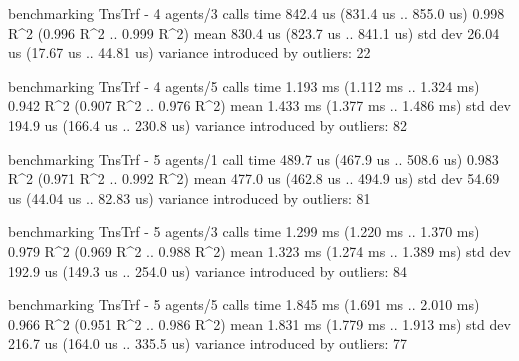 \begin{showCode}
benchmarking TnsTrf - 4 agents/3 calls
time                 842.4 us   (831.4 us .. 855.0 us)
                     0.998 R^2   (0.996 R^2 .. 0.999 R^2)
mean                 830.4 us   (823.7 us .. 841.1 us)
std dev              26.04 us   (17.67 us .. 44.81 us)
variance introduced by outliers: 22%

benchmarking TnsTrf - 4 agents/5 calls
time                 1.193 ms   (1.112 ms .. 1.324 ms)
                     0.942 R^2   (0.907 R^2 .. 0.976 R^2)
mean                 1.433 ms   (1.377 ms .. 1.486 ms)
std dev              194.9 us   (166.4 us .. 230.8 us)
variance introduced by outliers: 82%

benchmarking TnsTrf - 5 agents/1 call
time                 489.7 us   (467.9 us .. 508.6 us)
                     0.983 R^2   (0.971 R^2 .. 0.992 R^2)
mean                 477.0 us   (462.8 us .. 494.9 us)
std dev              54.69 us   (44.04 us .. 82.83 us)
variance introduced by outliers: 81%

benchmarking TnsTrf - 5 agents/3 calls
time                 1.299 ms   (1.220 ms .. 1.370 ms)
                     0.979 R^2   (0.969 R^2 .. 0.988 R^2)
mean                 1.323 ms   (1.274 ms .. 1.389 ms)
std dev              192.9 us   (149.3 us .. 254.0 us)
variance introduced by outliers: 84%

benchmarking TnsTrf - 5 agents/5 calls
time                 1.845 ms   (1.691 ms .. 2.010 ms)
                     0.966 R^2   (0.951 R^2 .. 0.986 R^2)
mean                 1.831 ms   (1.779 ms .. 1.913 ms)
std dev              216.7 us   (164.0 us .. 335.5 us)
variance introduced by outliers: 77%
\end{showCode}